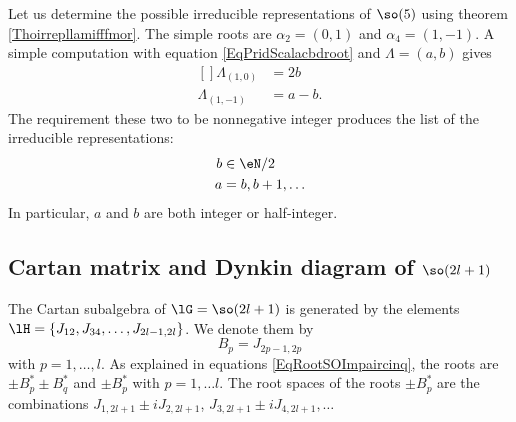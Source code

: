 Let us determine the possible irreducible representations of $\so(5)$ using theorem \ref{Thoirrepllamifffmor}. The simple roots are $\alpha_2=(0,1)$ and $\alpha_4=(1,-1)$. A simple computation with equation \eqref{EqPridScalacbdroot} and $\Lambda=(a,b)$ gives
\begin{equation}
	\begin{aligned}[]
		\Lambda_{(1,0)}&=2b\\		
		\Lambda_{(1,-1)}&=a-b.
	\end{aligned}
\end{equation}
The requirement these two to be nonnegative integer produces the list of the irreducible representations:
\begin{equation}			\label{EqIrrepsso5}
	\begin{aligned}[]
		b&\in \eN/2\\
		a&=b,b+1,\ldots
	\end{aligned}
\end{equation}
In particular, $a$ and $b$ are both integer or half-integer.

\subsection{Cartan matrix and Dynkin diagram of \texorpdfstring{$\so(2l+1)$}{so2l+1}}

The Cartan subalgebra of $\lG=\so(2l+1)$ is generated by the elements $\lH=\{ J_{12},J_{34},\ldots,J_{2l-1,2l} \}$.  We denote them by
\begin{equation}
	B_p=J_{2p-1,2p}
\end{equation}
with $p=1,\ldots,l$. As explained in equations \eqref{EqRootSOImpaircinq}, the roots are $\pm B_p^*\pm B_q^*$ and $\pm B_p^*$ with $p=1,\ldots l$. The root spaces of the roots $\pm B^*_p$ are the combinations $J_{1,2l+1}\pm iJ_{2,2l+1}$, $J_{3,2l+1}\pm iJ_{4,2l+1},\ldots$

